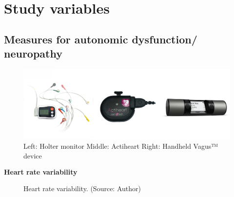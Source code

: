 \documentclass[
  a4paper,
  headsepline=true,
  open=any]{scrbook}
\begin{document}
\hypertarget{study-variables}{%
\section{Study variables}\label{study-variables}}

\hypertarget{measures-for-autonomic-dysfunction-neuropathy}{%
\subsection{Measures for autonomic dysfunction/
neuropathy}\label{measures-for-autonomic-dysfunction-neuropathy}}

\begin{figure}

{\centering \includegraphics[width=5in,height=\textheight]{images/can_tools.pdf}

}

\caption{Left: Holter monitor Middle: Actiheart Right: Handheld Vagus™
device}

\end{figure}

\textbf{Heart rate variability}

\begin{figure}

\begin{minipage}[t]{\linewidth}

{\centering 


\caption{Heart rate variability. (Source: Author)}

}

\end{minipage}%

\end{figure}
\end{document}
